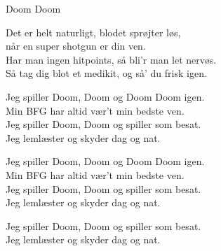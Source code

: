 \begin{song}{Doom Doom}
  \begin{SBSection*}
    Det er helt naturligt, blodet sprøjter løs,\\
    når en super shotgun er din ven.\\
    Har man ingen hitpoints, så bli'r man let nervøs.\\
    Så tag dig blot et medikit, og så' du frisk igen.
  \end{SBSection*}

  \begin{SBChorus}
    Jeg spiller Doom, Doom og Doom Doom igen.\\
    Min BFG har altid vær't min bedste ven.\\
    Jeg spiller Doom, Doom og spiller som besat.\\
    Jeg lemlæster og skyder dag og nat.
  \end{SBChorus}

  \begin{SBChorus}
    Jeg spiller Doom, Doom og Doom Doom igen.\\
    Min BFG har altid vær't min bedste ven.\\
    Jeg spiller Doom, Doom og spiller som besat.\\
    Jeg lemlæster og skyder dag og nat.
  \end{SBChorus}

  \begin{SBChorus}
    Jeg spiller Doom, Doom og spiller som besat.\\
    Jeg lemlæster og skyder dag og nat.
  \end{SBChorus}
\end{song}